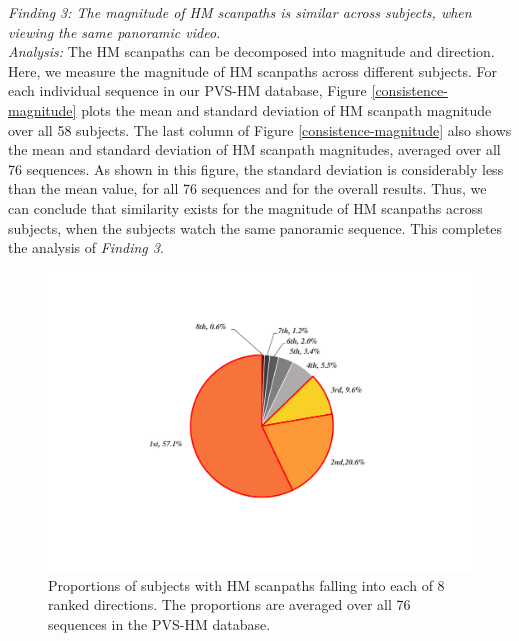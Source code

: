 \documentclass[10pt,journal,compsoc]{IEEEtran}
\begin{document}
\emph{Finding 3: The magnitude of HM scanpaths is similar across subjects, when viewing the same panoramic video.}
\\ \textit{Analysis:} The HM scanpaths can be decomposed into magnitude and direction.
 Here, we measure the magnitude of HM scanpaths across different subjects.
For each individual sequence in our PVS-HM database, Figure \ref{consistence-magnitude} plots the mean and standard deviation of HM scanpath magnitude over all 58 subjects.
The last column of Figure \ref{consistence-magnitude} also shows the mean and standard deviation of HM scanpath magnitudes, averaged over all 76 sequences.
As shown in this figure, the standard deviation is considerably less than the mean value, for all 76 sequences and for the overall results.
Thus, we can conclude that similarity exists for the magnitude of HM scanpaths across subjects, when the subjects watch the same panoramic sequence.
This completes the analysis of \textit{Finding 3}.


\begin{figure}
\vspace{-1.5em}
	\begin{center}
		\centerline{\includegraphics[width=.6\columnwidth]{figures/database/direction-consistence-distribution-pie}}%
\vspace{-1em}
		\caption{\footnotesize{Proportions of subjects with HM scanpaths falling into each of 8 ranked directions. The proportions are averaged over all 76 sequences in the PVS-HM database. }}
		\label{direction-consistence-pie}
	\end{center}
\vspace{-3.5em}
\end{figure}
\end{document}
